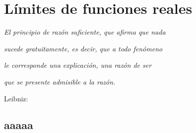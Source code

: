 
\chapter{Límites de funciones reales}

\PartialToc

\hypersetup{linkcolor=ptctitle}

\vspace*{0.5cm}
 
\begin{flushright}
\textit{\footnotesize{}El principio de razón suficiente, que afirma
que nada}
\par\end{flushright}{\footnotesize \par}

\begin{flushright}
\textit{\footnotesize{}sucede gratuitamente, es decir, que a todo
fenómeno }
\par\end{flushright}{\footnotesize \par}

\begin{flushright}
\textit{\footnotesize{}le corresponde una explicación, una razón de
ser }
\par\end{flushright}{\footnotesize \par}

\begin{flushright}
\textit{\footnotesize{}que se presente admisible a la razón. }
\par\end{flushright}{\footnotesize \par}

\begin{flushright}
{\small{} }Leibniz: 
\par\end{flushright}

\vspace*{-1mm}


\section{aaaaa}
